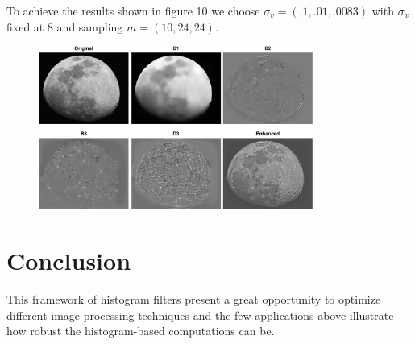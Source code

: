 \documentclass{acmsiggraph}
\begin{document}
To achieve the results shown in figure 10 we choose $\sigma_v=( .1, .01, .0083)$ with $\sigma_x$ fixed at 8 and sampling $m =(10, 24, 24)$.
\begin{figure}[H]
\centering
\includegraphics[width=9cm]{moon}
\caption{}
\end{figure}

\section{Conclusion}
This framework of histogram filters present a great opportunity to optimize different image processing techniques and the few applications above illustrate how robust the histogram-based computations can be.

\nocite{*}

\end{document}
